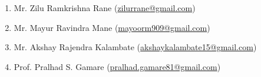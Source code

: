 \documentclass[a4paper,12pt]{report}
\begin{document}
\bf \large
\hspace{20mm}
\begin{enumerate}
   \item Mr. Zilu Ramkrishna Rane {(\underline{zilurrane@gmail.com})}
	\item Mr. Mayur Ravindra Mane {(\underline{mayoorm909@gmail.com})}
	\item Mr. Akshay Rajendra Kalambate {(\underline{akshaykalambate15@gmail.com})}
	\item Prof. Pralhad S. Gamare {(\underline{pralhad.gamare81@gmail.com})}
\end{enumerate}
\end{document}
